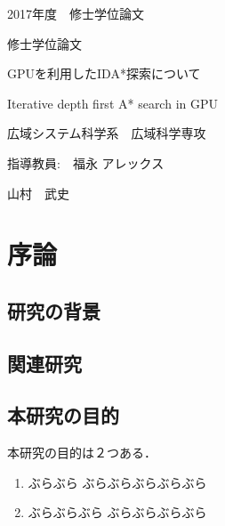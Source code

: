 \documentclass[a4paper,11pt,oneside,openany]{jsbook}
\begin{document}
\thispagestyle{empty}
2017年度　修士学位論文%
\bigskip%
\LARGE%
\begin{center}
修士学位論文
\end{center}
\bigskip\bigskip\bigskip\bigskip\bigskip\bigskip\bigskip %
\begin{center} %
GPUを利用したIDA*探索について
\end{center}
\large %
\begin{center}
Iterative depth first A* search in GPU
\end{center}
\bigskip\bigskip\bigskip\bigskip\bigskip\bigskip\bigskip\bigskip\bigskip\bigskip
\bigskip\bigskip\bigskip\bigskip\bigskip\bigskip\bigskip\bigskip\bigskip
\Large %
\begin{center}
広域システム科学系　広域科学専攻
\end{center}
\Large %
\begin{center}
指導教員:　福永 アレックス
\end{center}
\LARGE %
\begin{center}
山村　武史
\end{center}
\normalsize
\thispagestyle{empty}
\tableofcontents

\chapter{序論}
\section{研究の背景}


\section{関連研究}


\section{本研究の目的}
本研究の目的は２つある．
\begin{enumerate}
\item ぶらぶら
\vspace{3mm}
\newline
ぶらぶらぶらぶらぶら
\newline

\item ぶらぶらぶら
\vspace{3mm}
\newline
ぶらぶらぶらぶら
\end{enumerate}
\end{document}
